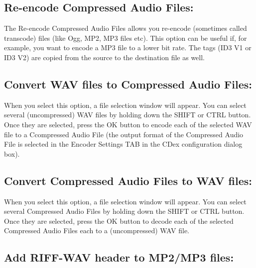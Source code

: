 \subsection{Re-encode Compressed Audio Files:}

The Re-encode Compressed Audio Files allows you re-encode (sometimes called transcode)
 files (like Ogg, MP2, MP3 files etc). This option can be useful if,
for example, you want to encode a MP3 file to a lower bit rate. The  tags (ID3 V1 or ID3 V2) are copied
from the source to the destination file as well.


\subsection{Convert WAV files to Compressed Audio Files:}

When you select this option, a file selection window will appear. You can select several
(uncompressed) WAV files by holding down the SHIFT or CTRL button. Once they are selected, press the
OK button to encode each of the selected WAV file to a Ccompressed Audio File (the output
format of the Compressed Audio File is selected in the Encoder Settings TAB in the 
CDex configuration dialog box).


\subsection{Convert Compressed Audio Files to WAV files:}

When you select this option, a file selection window will appear. You can select
several Compressed Audio Files by holding down the SHIFT or CTRL button. Once they are selected,
press the OK button to decode each of the selected Compressed Audio Files each to a (uncompressed)
WAV file.


\subsection{Add RIFF-WAV header to MP2/MP3 files:}

